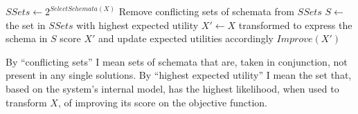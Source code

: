 \documentclass[letterpaper]{article}
\begin{document}
\begin{algorithmic}
  \State $SSets \leftarrow 2^{SelectSchemata(X)}$ 
  \State Remove conflicting sets of schemata from $SSets$
    \State $S \leftarrow$ the set in $SSets$ with highest expected utility
    \State $X' \leftarrow X$ transformed to express the schema in $S$
    \State score $X'$ and update expected utilities accordingly
      $Improve(X')$
    \EndIf
  \EndWhile
\EndProcedure
\end{algorithmic}

By ``conflicting sets'' I mean sets of schemata that are, taken in conjunction,
not present in any single solutions. By ``highest expected utility'' I mean the
set that, based on the system's internal model, has the highest likelihood,
when used to transform $X$, of improving its score on the objective function.
\end{document}
